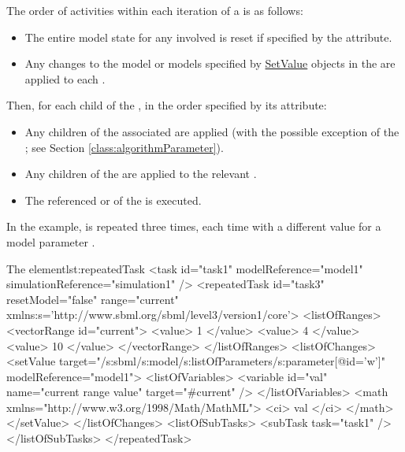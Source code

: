 The order of activities within each iteration of a  is as follows:
\begin{itemize} 
	\item The entire model state for any involved \Model is reset if specified by the \hyperref[sec:resetModel]{} attribute.
	\item Any changes to the model or models specified by \hyperref[class:setValue]{SetValue} objects in the \hyperref[sec:changesRepeatedTask]{} are applied to each \Model.
\end{itemize}

Then, for each \SubTask child of the \RepeatedTask, in the order specified by its \hyperref[sec:subTaskOrder]{} attribute:
\begin{itemize}
        \item Any \AlgorithmParameter children of the associated \Simulation are applied (with the possible exception of the ; see Section \ref{class:algorithmParameter}).
        \item Any \SetValue children of the \SubTask are applied to the relevant \Model.
        \item The referenced \Task or \RepeatedTask of the \SubTask is executed.

\end{itemize}


In the example,  is repeated three times, each time with a different value for a model parameter .
\begin{myXmlLst}{The  element}{lst:repeatedTask}
<task id="task1" modelReference="model1" simulationReference="simulation1" />
<repeatedTask id="task3" resetModel="false" range="current"
    xmlns:s='http://www.sbml.org/sbml/level3/version1/core'>
  <listOfRanges>
    <vectorRange id="current"> 
        <value> 1 </value> 
        <value> 4 </value> 
        <value> 10 </value> 
    </vectorRange> 
  </listOfRanges>
  <listOfChanges>
     <setValue target="/s:sbml/s:model/s:listOfParameters/s:parameter[@id='w']" modelReference="model1">
       <listOfVariables> 
         <variable id="val" name="current range value" target="#current" /> 
       </listOfVariables> 
       <math xmlns="http://www.w3.org/1998/Math/MathML"> 
         <ci> val </ci> 
       </math> 
     </setValue> 
  </listOfChanges>
  <listOfSubTasks>
    <subTask task="task1" />
  </listOfSubTasks>
</repeatedTask>
\end{myXmlLst}
 
